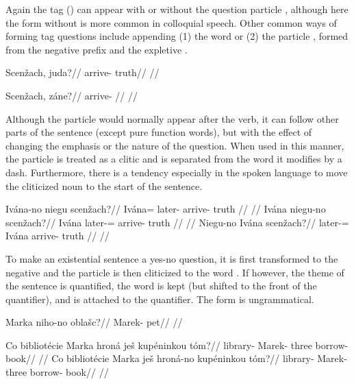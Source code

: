 Again the tag  () can appear with or without the question particle , although here the form without  is more common in colloquial speech. Other common ways of forming tag questions include appending (1) the word   or (2) the particle , formed from the negative prefix  and the expletive .

\pex
\a
\begingl
\gla Scen\v{z}ach, juda?//
\glb arrive- truth//
\glft {}//
\endgl

\a
\begingl
\gla Scen\v{z}ach, z\'ane?//
\glb arrive- //
\glft {}//
\endgl
\xe

Although the particle  would normally appear after the verb, it can follow other parts of the sentence (except pure function words), but with the effect of changing the emphasis or the nature of the question. When used in this manner, the particle is treated as a clitic and is separated from the word it modifies by a dash. Furthermore, there is a tendency especially in the spoken language to move the cliticized noun to the start of the sentence.

\pex
\a
\begingl
\gla Iv\'ana-no niegu scen\v{z}ach?//
\glb Iv\'ana= later- arrive- truth //
\glft {}//
\endgl
\a
\begingl
\gla Iv\'ana niegu-no scen\v{z}ach?//
\glb Iv\'ana later-= arrive- truth //
\glft {}//
\endgl
\a
\begingl
\gla Niegu-no Iv\'ana scen\v{z}ach?//
\glb later-= Iv\'ana arrive- truth //
\glft {}//
\endgl
\xe

To make an existential sentence a yes-no question, it is first transformed to the negative and the particle  is then cliticized to the word . If however, the theme of the sentence is quantified, the word  is kept (but shifted to the front of the quantifier), and  is attached to the quantifier. The form  is ungrammatical.

\pex
\begingl
\gla Marka niho-no obla\v{s}c?//
\glb Marek-  pet//
\glft {}//
\endgl
\xe

\pex
\a
\begingl
\gla Co bibliot\'ecie Marka hron\'a je\v{s} kup\'eninkou t\'om?//
\glb {} library- Marek- three  borrow- book//
\glft {}//
\endgl
\a
\begingl
\gla Co bibliot\'ecie Marka je\v{s} hron\'a-no kup\'eninkou t\'om?//
\glb {} library- Marek-  three borrow- book//
\glft {}//
\endgl
\xe

